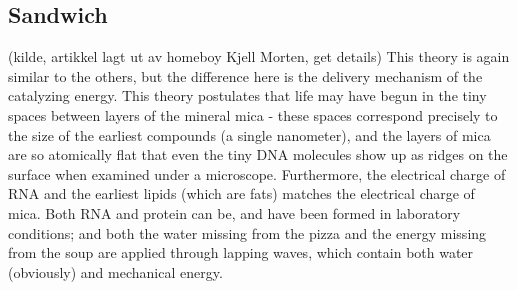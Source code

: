 \subsection{Sandwich} (kilde, artikkel lagt ut av homeboy Kjell Morten, get details)
This theory is again similar to the others, but the difference here is the delivery mechanism of the catalyzing energy. This theory postulates that life may have begun in the tiny spaces between layers of the mineral mica - these spaces correspond precisely to the size of the earliest compounds (a single nanometer), and the layers of mica are so atomically flat that even the tiny DNA molecules show up as ridges on the surface when examined under a microscope. Furthermore, the electrical charge of RNA and the earliest lipids (which are fats) matches the electrical charge of mica. Both RNA and protein can be, and have been formed in laboratory conditions; and both the water missing from the pizza and the energy missing from the soup are applied through lapping waves, which contain both water (obviously) and mechanical energy. 
